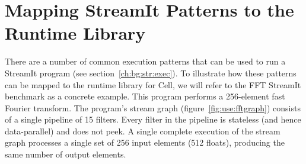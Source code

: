 \section{Mapping StreamIt Patterns to the Runtime Library}\label{ch:use}

There are a number of common execution patterns that can be used to run a StreamIt program (see section~\ref{ch:bg:str:exec}). To illustrate how these patterns can be mapped to the runtime library for Cell, we will refer to the FFT StreamIt benchmark as a concrete example. This program performs a 256-element fast Fourier transform. The program's stream graph (figure~\ref{fig:use:fftgraph}) consists of a single pipeline of 15 filters. Every filter in the pipeline is stateless (and hence data-parallel) and does not peek. A single complete execution of the stream graph processes a single set of 256 input elements (512 floats), producing the same number of output elements.

